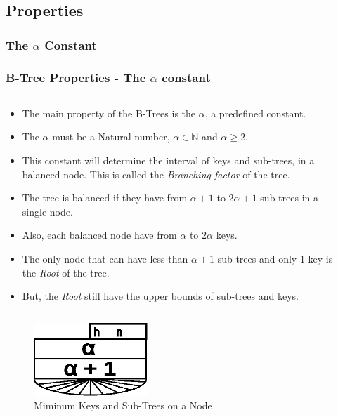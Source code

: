 \documentclass{beamer}
\begin{document}
\begin{frame}
    \subsection{Properties}
    \subsubsection{The \(\alpha\) Constant}
    \frametitle{B-Tree Properties - The \(\alpha\) constant}
    \begin{columns}
        \begin{column}{\textlecolumn}
            \begin{block}{}
                \begin{itemize}
                    \item The main property of the B-Trees is the \(\alpha\), a predefined constant.
                    \item The \(\alpha\) must be a Natural number, \(\alpha \in \mathbb{N}\) and \(\alpha \geq 2\).
                    \item This constant will determine the interval of keys and sub-trees, in a balanced node. This is called the \emph{Branching factor} of the tree.
                    \item The tree is balanced if they have from \(\alpha + 1\) to \(2\alpha + 1\) sub-trees in a single node.
                    \item Also, each balanced node have from \(\alpha\) to \(2\alpha\) keys.
                    \item The only node that can have less than \(\alpha + 1\) sub-trees and only 1 key is the \emph{Root} of the tree. 
                    \item But, the \emph{Root} still have the upper bounds of sub-trees and keys.
                \end{itemize}
            \end{block}
        \end{column}
        \begin{column}{\textricolumn}
        \end{column}
    \end{columns}
    \begin{columns}
        \begin{column}{0.5\textwidth}
                \begin{figure}
                    \includegraphics[width=0.45\textwidth]{resources/made/min_node.eps}
                    \caption[]{Miminum Keys and Sub-Trees on a Node}
                \end{figure}
        \end{column}
        \begin{column}{0.5\textwidth}


\end{column}
\end{columns}
\end{frame}
\end{document}
